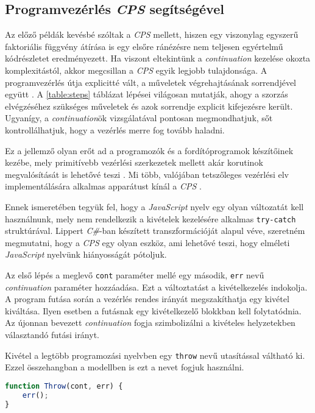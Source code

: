\subsection{Programvezérlés \textit{CPS} segítségével}

Az előző példák kevésbé szóltak a \textit{CPS} mellett, hiszen egy viszonylag egyszerű faktoriális függvény átírása is egy elsőre ránézésre nem teljesen egyértelmű kódrészletet eredményezett. Ha viszont eltekintünk a \textit{continuation} kezelése okozta komplexitástól, akkor megcsillan a \textit{CPS} egyik legjobb tulajdonsága. A programvezérlés útja explicitté vált, a műveletek végrehajtásának sorrendjével együtt . A \ref{table:steps} táblázat lépései világosan mutatják, ahogy a szorzás elvégzéséhez szükséges műveletek és azok sorrendje explicit kifejezésre került. Ugyanígy, a \textit{continuation}ök vizsgálatával pontosan megmondhatjuk, sőt kontrollálhatjuk, hogy a vezérlés merre fog tovább haladni.

Ez a jellemző olyan erőt ad a programozók és a fordítóprogramok készítőinek kezébe, mely primitívebb vezérlési szerkezetek mellett akár korutinok megvalósítását is lehetővé teszi . Mi több, valójában tetszőleges vezérlési elv implementálására alkalmas apparátust kínál a \textit{CPS} \cite{Lippert2010}. 

Ennek ismeretében tegyük fel, hogy a \textit{JavaScript} nyelv egy olyan változatát kell használnunk, mely nem rendelkezik a kivételek kezelésére alkalmas \texttt{try-catch} struktúrával. Lippert \citeyear{Lippert2010} \textit{C\#}-ban készített transzformációját alapul véve, szeretném megmutatni, hogy a \textit{CPS} egy olyan eszköz, ami lehetővé teszi, hogy elméleti \textit{JavaScript} nyelvünk hiányosságát pótoljuk.

Az első lépés a meglevő \texttt{cont} paraméter mellé egy második, \texttt{err} nevű \textit{continuation} paraméter hozzáadása. Ezt a változtatást a kivételkezelés indokolja. A program futása során a vezérlés rendes irányát megszakíthatja egy kivétel kiváltása. Ilyen esetben a futásnak egy kivételkezelő blokkban kell folytatódnia. Az újonnan bevezett \textit{continuation} fogja szimbolizálni a kivételes helyzetekben választandó futási irányt.

Kivétel a legtöbb programozási nyelvben egy \texttt{throw} nevű utasítással váltható ki. Ezzel összehangban a modellben is ezt a nevet fogjuk használni.

\begin{lstlisting}[language=JavaScript, caption={A \textit{throw} utasítás \textit{CPS}-ben}, captionpos=b, label=JSThrow]
function Throw(cont, err) {
    err();  
}
\end{lstlisting}

